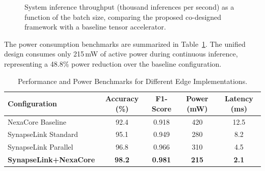 \begin{figure}[htbp]
\centering
{}
\caption{System inference throughput (thousand inferences per second) as a function of the batch size, comparing the proposed co-designed framework with a baseline tensor accelerator.}
\label{fig:throughput}
\end{figure}

The power consumption benchmarks are summarized in Table~\ref{tab:benchmarks}. The unified design consumes only 215\,mW of active power during continuous inference, representing a 48.8\% power reduction over the baseline configuration.

\begin{table}[htbp]
\centering
\caption{Performance and Power Benchmarks for Different Edge Implementations.}
\label{tab:benchmarks}
\vspace{0.2cm}
\begin{tabular}{lcccc}
\toprule
\textbf{Configuration} & \textbf{Accuracy (\%)} & \textbf{F1-Score} & \textbf{Power (mW)} & \textbf{Latency (ms)} \\
\midrule
NexaCore Baseline      & 92.4                   & 0.918             & 420                 & 12.5                  \\
SynapseLink Standard   & 95.1                   & 0.949             & 280                 & 8.2                   \\
SynapseLink Parallel   & 96.8                   & 0.966             & 310                 & 4.5                   \\
\textbf{SynapseLink+NexaCore} & \textbf{98.2}   & \textbf{0.981}    & \textbf{215}        & \textbf{2.1}          \\
\bottomrule
\end{tabular}
\end{table}

